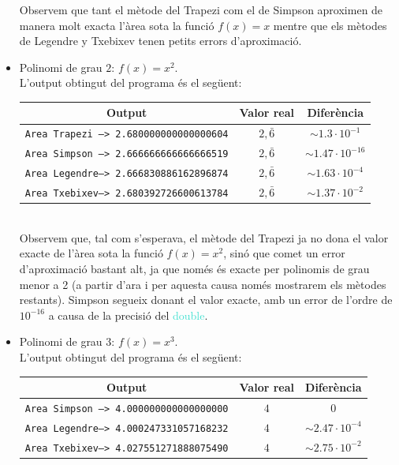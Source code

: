 \documentclass[12pt]{article}
\begin{document}
\begin{itemize}
    Observem que tant el mètode del Trapezi com el de Simpson aproximen de manera molt exacta l'àrea sota la funció $f(x)=x$ mentre que els mètodes de Legendre y Txebixev tenen petits errors d'aproximació.
\newpage
    \item Polinomi de grau $2$: $f(x) = x^2$.\\
     L'output obtingut del programa és el següent:
          \begin{table}[h]
            \begin{center}
            \begin{tabular}{ c | c | c }
            \textbf{Output} & \textbf{Valor real}  & \textbf{Diferència}\\ \hline
            \texttt{Area Trapezi --> 2.680000000000000604} & $2,\bar{6}$ & $\sim1.3\cdot 10^{-1}$\\ 
            \texttt{Area Simpson --> 2.666666666666666519} & $2,\bar{6}$ & $\sim1.47\cdot 10^{-16}$\\ 
            \texttt{Area Legendre--> 2.666830886162896874} & $2,\bar{6}$ & $\sim1.63\cdot 10^{-4}$\\ 
            \texttt{Area Txebixev--> 2.680392726600613784} & $2,\bar{6}$ & $\sim1.37\cdot 10^{-2}$\\ 
            \end{tabular}
            \end{center}
        \end{table}\\
    Observem que, tal com s'esperava, el mètode del Trapezi ja no dona el valor exacte de l'àrea sota la funció $f(x)=x^2$, sinó que comet un error d'aproximació bastant alt, ja que només és exacte per polinomis de grau menor a 2 (a partir d'ara i per aquesta causa només mostrarem els mètodes restants). Simpson segueix donant el valor exacte, amb un error de l'ordre de $10^{-16}$ a causa de la precisió del \textcolor{Turquoise}{double}.
    
    \item Polinomi de grau $3$: $f(x) = x^3$.\\
    L'output obtingut del programa és el següent:
  
        
          \begin{table}[h]
            \begin{center}
            \begin{tabular}{ c | c | c }
            \textbf{Output} & \textbf{Valor real}  & \textbf{Diferència}\\ \hline
            \texttt{Area Simpson --> 4.000000000000000000} & $4$ & $0$\\ 
            \texttt{Area Legendre--> 4.000247331057168232} & $4$ & $\sim2.47\cdot 10^{-4}$\\ 
            \texttt{Area Txebixev--> 4.027551271888075490} & $4$ & $\sim2.75 \cdot 10^{-2}$\\
            \end{tabular}
            \end{center}
        \end{table}
    

\end{itemize}
\end{document}
